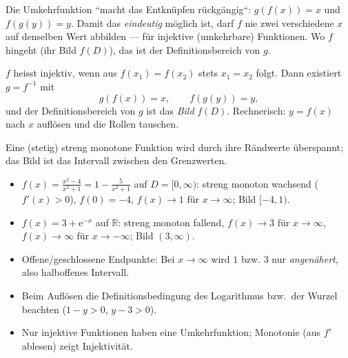 


Die Umkehrfunktion ``macht das Entkn\"upfen r\"uckg\"angig``: $g(f(x))=x$
und $f(g(y))=y$. Damit das \emph{eindeutig} m\"oglich ist, darf $f$ nie
zwei verschiedene $x$ auf denselben Wert abbilden --- f\"ur injektive
(umkehrbare) Funktionen. Wo $f$ hingeht (ihr Bild $f(D)$), das ist der
Definitionsbereich von $g$.

\begin{werkzeugkasten}
$f$ heisst injektiv, wenn aus $f(x_1)=f(x_2)$ stets $x_1=x_2$ folgt.
Dann existiert $g=f^{-1}$ mit
\begin{equation}
  g(f(x))=x,\qquad f(g(y))=y ,
\end{equation}
und der Definitionsbereich von $g$ ist das \emph{Bild} $f(D)$.
Rechnerisch: $y=f(x)$ nach $x$ aufl\"osen und die Rollen tauschen.
\end{werkzeugkasten}

\begin{werkzeugkasten}
Eine (stetig) streng monotone Funktion wird durch ihre R\"andwerte
\"uberspannt; das Bild ist das Intervall zwischen den Grenzwerten.
\begin{itemize}
  \item $f(x)=\frac{x^2-4}{x^2+1}=1-\frac5{x^2+1}$ auf $D=[0,\infty)$:
        streng monoton wachsend ($f'(x)>0$), $f(0)=-4$,
        $f(x)\to1$ f\"ur $x\to\infty$; Bild $[-4,1)$.
  \item $f(x)=3+\mathrm e^{-x}$ auf $\mathbb R$: streng monoton fallend,
        $f(x)\to3$ f\"ur $x\to\infty$, $f(x)\to\infty$ f\"ur
        $x\to-\infty$; Bild $(3,\infty)$.
\end{itemize}
\end{werkzeugkasten}

\begin{achtung}
\begin{itemize}
  \item Offene/geschlossene Endpunkte: Bei $x\to\infty$ wird $1$ bzw.
        $3$ nur \emph{angen\"ahert}, also halboffenes Intervall.
  \item Beim Aufl\"osen die Definitionsbedingung des Logarithmus bzw.\ der
        Wurzel beachten ($1-y>0$, $y-3>0$).
  \item Nur injektive Funktionen haben eine Umkehrfunktion; Monotonie
        (aus $f'$ ablesen) zeigt Injektivit\"at.
\end{itemize}
\end{achtung}
